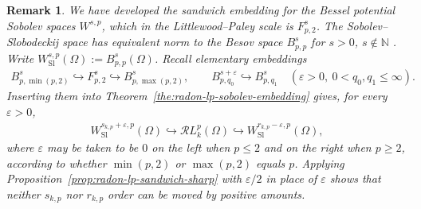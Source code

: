\documentclass[12pt]{article}
\numberwithin{equation}{section}
\newtheorem{remark}{Remark}
\numberwithin{figure}{section}
\numberwithin{equation}{section}
\begin{document}
\begin{remark}
\label{rem:slobodeckij-sandwich}
We have developed the sandwich embedding for the Bessel potential Sobolev spaces $W^{s,p}$, 
which in the Littlewood--Paley scale is $F^{s}_{p,2}$. The Sobolev--Slobodeckij space has 
equivalent norm to the Besov space $B^{s}_{p,p}$ for $s>0$, $s\notin\mathbb{N}$
\cite{triebel_theoryfunctionspaces_1992}. Write
$W^{s,p}_{\mathrm{Sl}}(\Omega):=B^{s}_{p,p}(\Omega)$. Recall elementary embeddings~
\cite{edmunds_FunctionSpacesEntropy_1996, triebel_theoryfunctionspaces_1992,shi_NewEstimatesRychkovs_2024} 
\begin{align*}
    B^{s}_{p,\min(p,2)}\hookrightarrow F^{s}_{p,2}\hookrightarrow B^{s}_{p,\max(p,2)},
    \qquad
    B^{s+\varepsilon}_{p,q_{0}}\hookrightarrow B^{s}_{p,q_{1}}
    \quad(\varepsilon>0,\ 0<q_{0},q_{1}\le\infty).
\end{align*}
Inserting them into Theorem~\ref{the:radon-lp-sobolev-embedding} gives, 
for every $\varepsilon>0$,
\begin{align*}
    W^{s_{k,p}+\varepsilon,p}_{\mathrm{Sl}}(\Omega)
    \hookrightarrow\mathcal{R}L^{p}_{k}(\Omega)
    \hookrightarrow W^{r_{k,p}-\varepsilon,p}_{\mathrm{Sl}}(\Omega),
\end{align*}
where $\varepsilon$ may be taken to be $0$ on the left when $p\le2$ and on the right
when $p\ge2$, according to whether $\min(p,2)$ or $\max(p,2)$ equals $p$. Applying 
Proposition~\ref{prop:radon-lp-sandwich-sharp} with $\varepsilon/2$
in place of $\varepsilon$ shows that neither $s_{k,p}$ nor $r_{k,p}$ order can be moved 
by positive amounts.
\end{remark}


\end{document}
